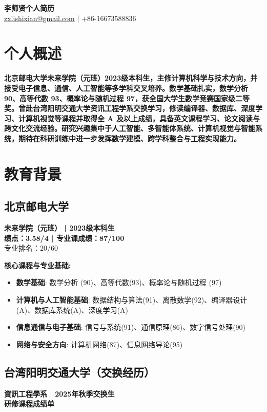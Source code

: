 \documentclass[11pt, a4paper]{article}
\newcommand{\namesection}[2]{
    \begin{center}
        {\Huge \textbf{#1}} \\
        \vspace{5pt}
        {\large #2}
    \end{center}
    \vspace{10pt}
}
\newenvironment{tightemize}{
    \begin{itemize}[leftmargin=*, nosep]
    \setlength{\itemsep}{3pt}
    \setlength{\parskip}{0pt}
}{\end{itemize}}
\begin{document}
\namesection{李师贤个人简历}{ 
\href{mailto:zxlishixian@gmail.com}{zxlishixian@gmail.com}  |   +86-16673588836
}

\section{个人概述}

\textbf{\hspace{2em}北京邮电大学未来学院（元班）2023级本科生，主修计算机科学与技术方向，并接受电子信息、通信、人工智能等多学科交叉培养。数学基础扎实，数学分析 90、高等代数 93、概率论与随机过程 97，获全国大学生数学竞赛国家级二等奖。曾赴台湾阳明交通大学资讯工程学系交换学习，修读编译器、数据库、深度学习、计算机视觉等课程并取得全 A 及以上成绩，具备英文课程学习、论文阅读与跨文化交流经验。研究兴趣集中于人工智能、多智能体系统、计算机视觉与智能系统，期待在科研训练中进一步发挥数学建模、跨学科整合与工程实现能力。}

\section{教育背景}

\subsection{北京邮电大学}
\textbf{未来学院（元班） | 2023级本科生} \\

\textbf{绩点：3.58/4  |  专业课成绩：87/100} \\
专业排名：20/60

\textbf{核心课程与专业基础:}
\begin{tightemize}
    \item \textbf{数学基础}: 数学分析 (90)、高等代数(93)、概率论与随机过程 (97)
    \item \textbf{计算机与人工智能基础}: 数据结构与算法(91)、离散数学(92)、编译器设计(A)、数据库系统(A)、深度学习(A)
    \item \textbf{信息通信与电子基础}: 信号与系统(91)、通信原理(86)、数字信号处理(90)
    \item \textbf{网络与安全方向}: 计算机网络(87)、信息网络导论(95)
\end{tightemize}

\vspace{0.2cm}

\subsection{台湾阳明交通大学（交换经历）}
\textbf{資訊工程學系 | 2025年秋季交换生} \\
\textbf{研修课程成绩单} \\
\end{document}
